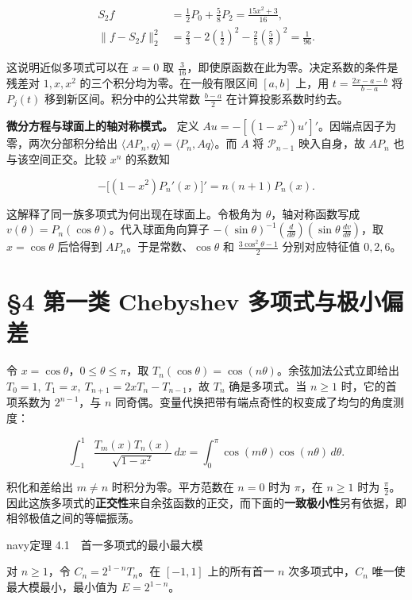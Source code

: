 \documentclass[11pt,a4paper]{article}
\newcommand{\lectureheading}[1]{\section{#1}}
\begin{document}
\[
\begin{aligned}
S_2 f&=\frac12P_0+\frac58P_2=\frac{15x^2+3}{16},\\
\|f-S_2 f\|_2^2
&=\frac23-2\left(\frac12\right)^2-\frac25\left(\frac58\right)^2
=\frac{1}{96}.
\end{aligned}
\]

这说明近似多项式可以在 \(x=0\) 取 \(\frac{3}{16}\)，即使原函数在此为零。决定系数的条件是残差对 \(1,x,x^2\) 的三个积分均为零。在一般有限区间 \([a,b]\) 上，用 \(t=\frac{2x-a-b}{b-a}\) 将 \(P_j(t)\) 移到新区间。积分中的公共常数 \(\frac{b-a}{2}\) 在计算投影系数时约去。

\textbf{微分方程与球面上的轴对称模式。} 定义 \(Au=-[(1-x^2)u']'\)。因端点因子为零，两次分部积分给出 \(\langle AP_n,q\rangle=\langle P_n,Aq\rangle\)。而 \(A\) 将 \(\mathcal P_{n-1}\) 映入自身，故 \(AP_n\) 也与该空间正交。比较 \(x^n\) 的系数知

\[
-\bigl[(1-x^2)P_n'(x)\bigr]'=n(n+1)P_n(x).
\]

这解释了同一族多项式为何出现在球面上。令极角为 \(\theta\)，轴对称函数写成 \(v(\theta)=P_n(\cos\theta)\)。代入球面角向算子 \(-(\sin\theta)^{-1}(\frac{d}{d\theta})(\sin\theta\,\frac{dv}{d\theta})\)，取 \(x=\cos\theta\) 后恰得到 \(AP_n\)。于是常数、\(\cos\theta\) 和 \(\frac{3\cos^2\theta-1}{2}\) 分别对应特征值 \(0,2,6\)。

\clearpage\lectureheading{§4 第一类 Chebyshev 多项式与极小偏差}

令 \(x=\cos\theta\)，\(0\le\theta\le\pi\)，取 \(T_n(\cos\theta)=\cos(n\theta)\)。余弦加法公式立即给出 \(T_0=1,\ T_1=x,\ T_{n+1}=2xT_n-T_{n-1}\)，故 \(T_n\) 确是多项式。当 \(n\ge1\) 时，它的首项系数为 \(2^{n-1}\)，与 \(n\) 同奇偶。变量代换把带有端点奇性的权变成了均匀的角度测度：

\[
\int_{-1}^1\frac{T_m(x)T_n(x)}{\sqrt{1-x^2}}\,dx
=\int_0^\pi\cos(m\theta)\cos(n\theta)\,d\theta .
\]

积化和差给出 \(m\ne n\) 时积分为零。平方范数在 \(n=0\) 时为 \(\pi\)，在 \(n\ge1\) 时为 \(\frac{\pi}{2}\)。因此这族多项式的\textbf{正交性}来自余弦函数的正交，而下面的\textbf{一致极小性}另有依据，即相邻极值之间的等幅振荡。

\begin{sboxenv}{navy}{定理 4.1　首一多项式的最小最大模}

对 \(n\ge1\)，令 \(C_n=2^{1-n}T_n\)。在 \([-1,1]\) 上的所有首一 \(n\) 次多项式中，\(C_n\) 唯一使最大模最小，最小值为 \(E=2^{1-n}\)。

\end{sboxenv}
\end{document}

